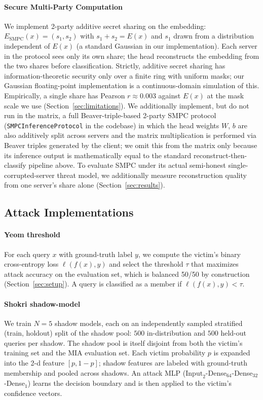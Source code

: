 \documentclass[conference]{IEEEtran}
\begin{document}
\paragraph{Secure Multi-Party Computation} We implement 2-party additive secret sharing on the embedding: $E_{\mathrm{SMPC}}(x) = (s_1, s_2)$ with $s_1 + s_2 = E(x)$ and $s_1$ drawn from a distribution independent of $E(x)$ (a standard Gaussian in our implementation). Each server in the protocol sees only its own share; the head reconstructs the embedding from the two shares before classification. Strictly, additive secret sharing has information-theoretic security only over a finite ring with uniform masks; our Gaussian floating-point implementation is a continuous-domain simulation of this. Empirically, a single share has Pearson $r \approx 0.003$ against $E(x)$ at the mask scale we use (Section~\ref{sec:limitations}). We additionally implement, but do not run in the matrix, a full Beaver-triple-based 2-party SMPC protocol (\texttt{SMPCInferenceProtocol} in the codebase) in which the head weights $W$, $b$ are also additively split across servers and the matrix multiplication is performed via Beaver triples generated by the client; we omit this from the matrix only because its inference output is mathematically equal to the standard reconstruct-then-classify pipeline above. To evaluate SMPC under its actual semi-honest single-corrupted-server threat model, we additionally measure reconstruction quality from one server's share alone (Section~\ref{sec:results}).

\subsection{Attack Implementations}

\paragraph{Yeom threshold} For each query $x$ with ground-truth label $y$, we compute the victim's binary cross-entropy loss $\ell(f(x), y)$ and select the threshold $\tau$ that maximizes attack accuracy on the evaluation set, which is balanced 50/50 by construction (Section~\ref{sec:setup}). A query is classified as a  {member} if $\ell(f(x), y) < \tau$.

\paragraph{Shokri shadow-model} We train $N=5$ shadow models, each on an independently sampled stratified (train, holdout) split of the shadow pool: $500$ in-distribution and $500$ held-out queries per shadow. The shadow pool is itself disjoint from both the victim's training set and the MIA evaluation set. Each victim probability $p$ is expanded into the 2-d feature $[p, 1-p]$; shadow features are labeled with ground-truth membership and pooled across shadows. An attack MLP ($\mathrm{Input}_{2}$-Dense$_{64}$-Dense$_{32}$-Dense$_{1}$) learns the decision boundary and is then applied to the victim's confidence vectors.
\end{document}
